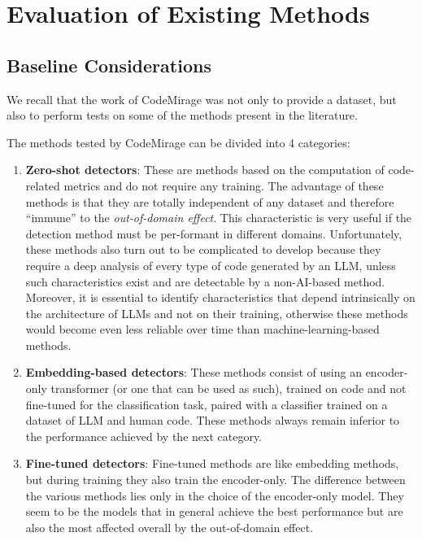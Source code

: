 \section{Evaluation of Existing Methods}
\subsection{Baseline Considerations}
We recall that the work of CodeMirage\cite{guo2025codemirage} was 
not only to provide a dataset, but also to perform 
tests on some of the methods present in the literature.

The methods tested by CodeMirage can be divided into 4 categories:
\begin{enumerate}
    \item \textbf{Zero-shot detectors}: 
    These are methods based on the computation of code-related metrics and do not require any training.
    \newline The advantage of these methods is that they are totally independent of any dataset 
    and therefore “immune” to the \textit{out-of-domain effect}. This characteristic is very useful 
    if the detection method must be per-formant in different domains. 
    \newline Unfortunately, these methods also turn out to be complicated to develop 
    because they require a deep analysis of every type of code generated by an LLM, 
    unless such characteristics exist and are detectable by a non-AI-based method. 
    \newline Moreover, it is essential to identify characteristics that depend intrinsically on the 
    architecture of LLMs and not on their training, otherwise these methods would 
    become even less reliable over time than machine-learning-based methods.

    
    \item \textbf{Embedding-based detectors}: 
    These methods consist of using an encoder-only transformer 
    (or one that can be used as such), trained on code and not 
    fine-tuned for the classification task, paired with a classifier 
    trained on a dataset of LLM and human code.
    \newline These methods always remain inferior to the performance achieved by the next category.
    
    \item \textbf{Fine-tuned detectors}: 
    Fine-tuned methods are like embedding methods, but during training they 
    also train the encoder-only. The difference between the various methods 
    lies only in the choice of the encoder-only model. They seem to be the 
    models that in general achieve the best performance but are also the most 
    affected overall by the out-of-domain effect.
    

\end{enumerate}
